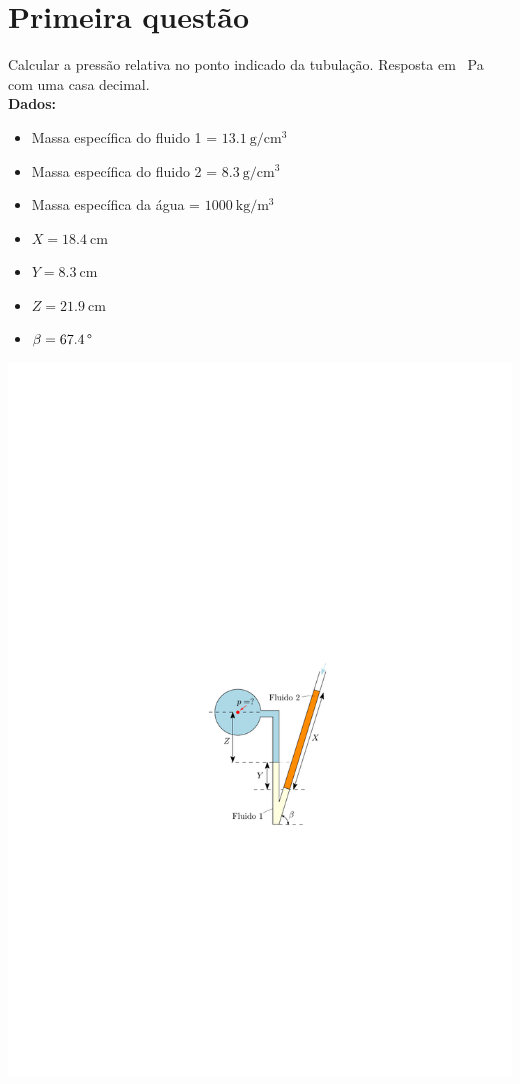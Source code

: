 \documentclass[
	a4paper,
	12pt,
	brazilian
]{article}
\begin{document}
	\section{Primeira questão}
	Calcular a pressão relativa no ponto indicado da tubulação. Resposta em \SI{}{\pascal} com uma casa decimal.\\
	\textbf{Dados:}
	\begin{itemize}
		\item Massa específica do fluido 1 = $\SI{13.1}{\gram/\centi\meter^{3}}$
		\item Massa específica do fluido 2 = $\SI{8.3}{\gram/\centi\meter^{3}}$
		\item Massa específica da água = $\SI{1000}{\kilogram/\meter^{3}}$
		\item $X=\SI{18.4}{\centi\meter}$
		\item $Y=\SI{8.3}{\centi\meter}$
		\item $Z=\SI{21.9}{\centi\meter}$
		\item $\beta=\SI{67.4}{\SIUnitSymbolDegree}$
	\end{itemize}
	\vspace{-7cm}
	\begin{flushright}
			\includegraphics[width=0.4\linewidth]{assets/images/ex1}
	\end{flushright}
\end{document}
